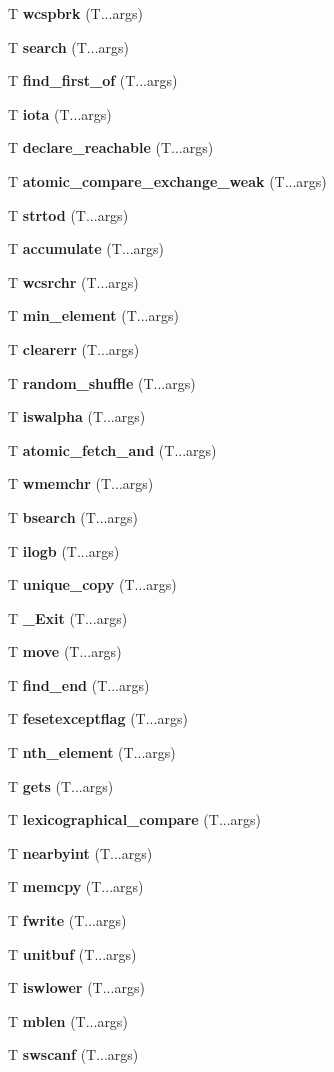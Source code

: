 \begin{DoxyCompactItemize}
\item 
T {\bf wcspbrk} (T...\+args)
\item 
T {\bf search} (T...\+args)
\item 
T {\bf find\+\_\+first\+\_\+of} (T...\+args)
\item 
T {\bf iota} (T...\+args)
\item 
T {\bf declare\+\_\+reachable} (T...\+args)
\item 
T {\bf atomic\+\_\+compare\+\_\+exchange\+\_\+weak} (T...\+args)
\item 
T {\bf strtod} (T...\+args)
\item 
T {\bf accumulate} (T...\+args)
\item 
T {\bf wcsrchr} (T...\+args)
\item 
T {\bf min\+\_\+element} (T...\+args)
\item 
T {\bf clearerr} (T...\+args)
\item 
T {\bf random\+\_\+shuffle} (T...\+args)
\item 
T {\bf iswalpha} (T...\+args)
\item 
T {\bf atomic\+\_\+fetch\+\_\+and} (T...\+args)
\item 
T {\bf wmemchr} (T...\+args)
\item 
T {\bf bsearch} (T...\+args)
\item 
T {\bf ilogb} (T...\+args)
\item 
T {\bf unique\+\_\+copy} (T...\+args)
\item 
T {\bf \+\_\+\+Exit} (T...\+args)
\item 
T {\bf move} (T...\+args)
\item 
T {\bf find\+\_\+end} (T...\+args)
\item 
T {\bf fesetexceptflag} (T...\+args)
\item 
T {\bf nth\+\_\+element} (T...\+args)
\item 
T {\bf gets} (T...\+args)
\item 
T {\bf lexicographical\+\_\+compare} (T...\+args)
\item 
T {\bf nearbyint} (T...\+args)
\item 
T {\bf memcpy} (T...\+args)
\item 
T {\bf fwrite} (T...\+args)
\item 
T {\bf unitbuf} (T...\+args)
\item 
T {\bf iswlower} (T...\+args)
\item 
T {\bf mblen} (T...\+args)
\item 
T {\bf swscanf} (T...\+args)
\item 

\end{DoxyCompactItemize}
